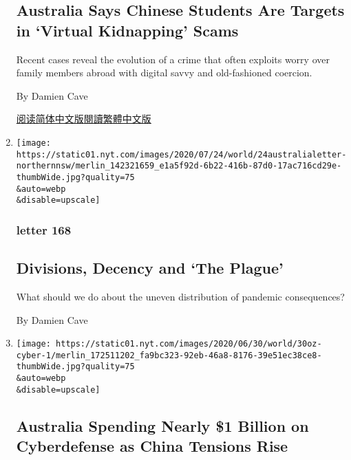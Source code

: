 \begin{enumerate}
  \hypertarget{australia-says-chinese-students-are-targets-in-virtual-kidnapping-scams}{%
  \subsection{Australia Says Chinese Students Are Targets in `Virtual
  Kidnapping'
  Scams}\label{australia-says-chinese-students-are-targets-in-virtual-kidnapping-scams}}

  Recent cases reveal the evolution of a crime that often exploits worry
  over family members abroad with digital savvy and old-fashioned
  coercion.

  By Damien Cave

  \href{https://cn.nytimes.com/asia-pacific/20200729/chinese-students-virtual-kidnapping/}{阅读简体中文版}\href{https://cn.nytimes.com/asia-pacific/20200729/chinese-students-virtual-kidnapping/zh-hant/}{閱讀繁體中文版}
\item
  \href{/2020/07/24/world/australia/divisions-decency-and-the-plague.html}{}

  \texttt{[image: https://static01.nyt.com/images/2020/07/24/world/24australialetter-northernnsw/merlin\_142321659\_e1a5f92d-6b22-416b-87d0-17ac716cd29e-thumbWide.jpg?quality=75\\\&auto=webp\\\&disable=upscale]}

  \hypertarget{letter-168}{%
  \subsubsection{letter 168}\label{letter-168}}

  \hypertarget{divisions-decency-and-the-plague}{%
  \subsection{Divisions, Decency and `The
  Plague'}\label{divisions-decency-and-the-plague}}

  What should we do about the uneven distribution of pandemic
  consequences?

  By Damien Cave
\item
  \href{/2020/06/30/world/australia/cyber-defense-china-hacking.html}{}

  \texttt{[image: https://static01.nyt.com/images/2020/06/30/world/30oz-cyber-1/merlin\_172511202\_fa9bc323-92eb-46a8-8176-39e51ec38ce8-thumbWide.jpg?quality=75\\\&auto=webp\\\&disable=upscale]}

  \hypertarget{australia-spending-nearly-1-billion-on-cyberdefense-as-china-tensions-rise}{%
  \subsection{Australia Spending Nearly \$1 Billion on Cyberdefense as
  China Tensions
  Rise}\label{australia-spending-nearly-1-billion-on-cyberdefense-as-china-tensions-rise}}


\end{enumerate}

